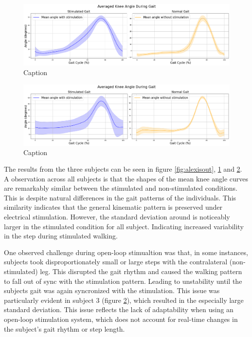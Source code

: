 \begin{figure}[h]
    \centering
    \includegraphics[width=0.99\linewidth]{images/katlaoutput1.png}
    \caption{Caption}
    \label{fig:katlaout}
\end{figure}

\begin{figure} [h]
    \centering
    \includegraphics[width=0.99\linewidth]{images/leonioutput1.png}
    \caption{Caption}
    \label{fig:leoniout}
\end{figure}

The results from the three subjects can be seen in figure \ref{fig:alexisout}, \ref{fig:katlaout} and \ref{fig:leoniout}. A observation across all subjects is that the shapes of the mean knee angle curves are remarkably similar between the stimulated and non-stimulated conditions. This is despite natural differences in the gait patterns of the individuals. This similarity indicates that the general kinematic pattern is preserved under electrical stimulation. However, the standard deviation around is noticeably larger in the stimulated condition for all subject. Indicating increased variability in the step during stimulated walking.

One observed challenge during open-loop stimualtion was that, in some instances, subjects took disproportionately small or large steps with the contralateral (non-stimulated) leg. This disrupted the gait rhythm and caused the walking pattern to fall out of sync with the stimulation pattern. Leading to unstability until the subjects gait was again syncronized with the stimulation. This issue was particularly evident in subject 3 (figure \ref{fig:leoniout}), which resulted in the especially large standard deviation. This issue reflects the lack of adaptability when using an open-loop stimulation system, which does not account for real-time changes in the subject's gait rhythm or step length. 

